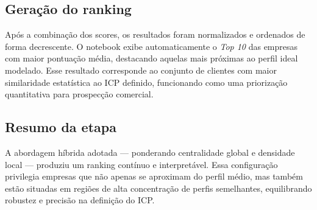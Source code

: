 \subsection{Geração do ranking}

Após a combinação dos scores, os resultados foram normalizados e ordenados de forma decrescente. O notebook exibe automaticamente o \textit{Top 10} das empresas com maior pontuação média, destacando aquelas mais próximas ao perfil ideal modelado. Esse resultado corresponde ao conjunto de clientes com maior similaridade estatística ao ICP definido, funcionando como uma priorização quantitativa para prospecção comercial.

\subsection{Resumo da etapa}

A abordagem híbrida adotada — ponderando centralidade global e densidade local — produziu um ranking contínuo e interpretável. Essa configuração privilegia empresas que não apenas se aproximam do perfil médio, mas também estão situadas em regiões de alta concentração de perfis semelhantes, equilibrando robustez e precisão na definição do ICP.